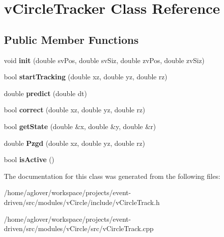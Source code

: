 \hypertarget{classvCircleTracker}{}\section{v\+Circle\+Tracker Class Reference}
\label{classvCircleTracker}
\subsection*{Public Member Functions}
\begin{DoxyCompactItemize}
\item 
void {\bfseries init} (double sv\+Pos, double sv\+Siz, double zv\+Pos, double zv\+Siz)\hypertarget{classvCircleTracker_af2b25d915f5c517b64514409fb993703}{}\label{classvCircleTracker_af2b25d915f5c517b64514409fb993703}

\item 
bool {\bfseries start\+Tracking} (double xz, double yz, double rz)\hypertarget{classvCircleTracker_aab8929299dc8caf0393d4c1565a05995}{}\label{classvCircleTracker_aab8929299dc8caf0393d4c1565a05995}

\item 
double {\bfseries predict} (double dt)\hypertarget{classvCircleTracker_ae56bc313864551e5f8b09dedebec0d79}{}\label{classvCircleTracker_ae56bc313864551e5f8b09dedebec0d79}

\item 
bool {\bfseries correct} (double xz, double yz, double rz)\hypertarget{classvCircleTracker_ad84e5c23fec79d12f1f5007176d4fe4f}{}\label{classvCircleTracker_ad84e5c23fec79d12f1f5007176d4fe4f}

\item 
bool {\bfseries get\+State} (double \&x, double \&y, double \&r)\hypertarget{classvCircleTracker_a41cfcda05d1e9e46bf98636c045cc326}{}\label{classvCircleTracker_a41cfcda05d1e9e46bf98636c045cc326}

\item 
double {\bfseries Pzgd} (double xz, double yz, double rz)\hypertarget{classvCircleTracker_ad1d7602e56934c432c46aaeb639a5015}{}\label{classvCircleTracker_ad1d7602e56934c432c46aaeb639a5015}

\item 
bool {\bfseries is\+Active} ()\hypertarget{classvCircleTracker_a99d43513683806249f7bdc36a8879b4f}{}\label{classvCircleTracker_a99d43513683806249f7bdc36a8879b4f}

\end{DoxyCompactItemize}


The documentation for this class was generated from the following files\+:\begin{DoxyCompactItemize}
\item 
/home/aglover/workspace/projects/event-\/driven/src/modules/v\+Circle/include/v\+Circle\+Track.\+h\item 
/home/aglover/workspace/projects/event-\/driven/src/modules/v\+Circle/src/v\+Circle\+Track.\+cpp\end{DoxyCompactItemize}
